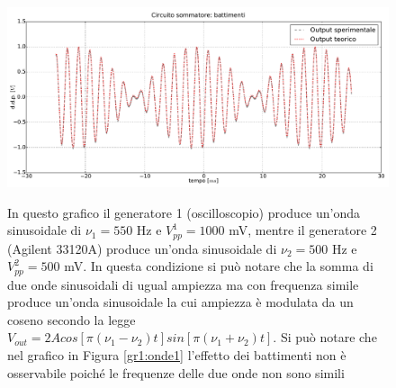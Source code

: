 \begin{figure}[ht]
 \centering
   {\includegraphics[width=14.8cm]{../E01/latex/battimenti_ideali.pdf}}
 \caption{In questo grafico il generatore 1 (oscilloscopio) produce un'onda sinusoidale di $\nu_1=550$ \si{\hertz} e $V^1_{pp}=1000$ \si{\milli\volt}, mentre il generatore 2 (Agilent 33120A) produce un'onda sinusoidale di $\nu_2=500$ \si{\hertz} e $V^2_{pp}=500$ \si{\milli\volt}. In questa condizione si può notare che la somma di due onde sinusoidali di ugual ampiezza ma con frequenza simile produce un'onda sinusoidale la cui ampiezza è modulata da un coseno secondo la legge $V_{out} = 2Acos\left[\pi(\nu_1 - \nu_2)t\right]sin\left[\pi(\nu_1 + \nu_2)t\right]$. Si può notare che nel grafico in Figura \ref{gr1:onde1} l'effetto dei battimenti non è osservabile poiché le frequenze delle due onde non sono simili} 
 \label{gr1:battimenti}
\end{figure}

